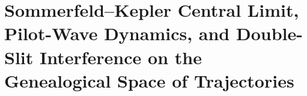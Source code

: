 \chapter{Sommerfeld--Kepler Central Limit, Pilot-Wave Dynamics, and Double-Slit Interference on the Genealogical Space of Trajectories}
\label{chap:md-sommerfeld-piloto-rendija}
\begingroup
\let\HMTOwnerSection\section
\let\HMTOwnerSubsection\subsection
\let\HMTOwnerSubsubsection\subsubsection
\let\HMTOwnerParagraph\paragraph
\let\chapter\HMTOwnerSection
\let\section\HMTOwnerSubsection
\let\subsection\HMTOwnerSubsubsection
\let\subsubsection\HMTOwnerParagraph

\endgroup
\begingroup
\let\HMTOwnerSection\section
\let\HMTOwnerSubsection\subsection
\let\HMTOwnerSubsubsection\subsubsection
